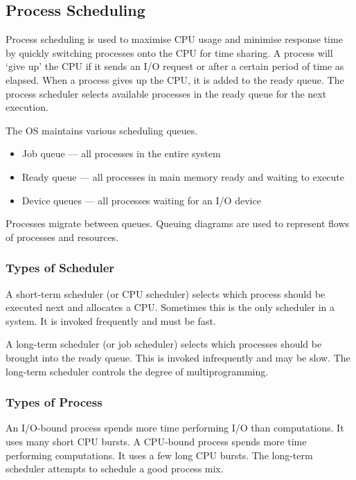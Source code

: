 \subsection{Process Scheduling}

Process scheduling is used to maximise CPU usage and minimise response time by quickly switching processes onto the CPU for time sharing.
A process will `give up' the CPU if it sends an I/O request or after a certain period of time as elapsed.
When a process gives up the CPU, it is added to the ready queue. 
The process scheduler selects available processes in the ready queue for the next execution.

The OS maintains various scheduling queues.
\begin{itemize}
  \item Job queue --- all processes in the entire system
  \item Ready queue --- all processes in main memory ready and waiting to execute
  \item Device queues --- all processes waiting for an I/O device
\end{itemize}

Processes migrate between queues.
Queuing diagrams are used to represent flows of processes and resources.

\subsubsection{Types of Scheduler}

A short-term scheduler (or CPU scheduler) selects which process should be executed next and allocates a CPU\@.
Sometimes this is the only scheduler in a system.
It is invoked frequently and must be fast.

A long-term scheduler (or job scheduler) selects which processes should be brought into the ready queue.
This is invoked infrequently and may be slow.
The long-term scheduler controls the degree of multiprogramming.

\subsubsection{Types of Process}

An I/O-bound process spends more time performing I/O than computations.
It uses many short CPU bursts.
\newline
A CPU-bound process spends more time performing computations.
It uses a few long CPU bursts.
\newline
The long-term scheduler attempts to schedule a good process mix.

